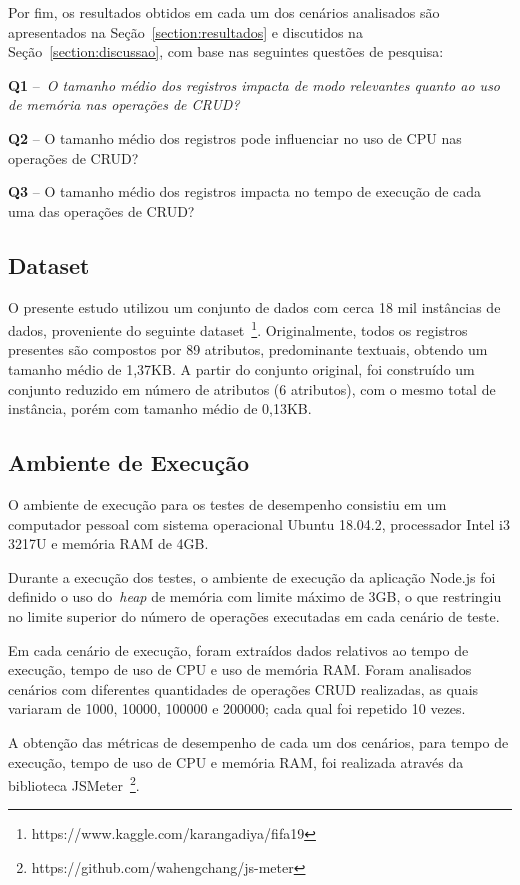 \documentclass[12pt]{article}
\begin{document}
Por fim, os resultados obtidos em cada um dos cenários analisados são apresentados na Seção~\ref{section:resultados} e discutidos na Seção~\ref{section:discussao}, com base nas seguintes questões de pesquisa:

\textbf{Q1} --~\emph{O tamanho médio dos registros impacta de modo relevantes quanto ao uso de memória nas operações de CRUD?}

\textbf{Q2} -- O tamanho médio dos registros pode influenciar no uso de CPU nas operações de CRUD? 

\textbf{Q3} -- O tamanho médio dos registros impacta no tempo de execução de cada uma das operações de CRUD?


\subsection{Dataset}

O presente estudo utilizou um conjunto de dados com cerca 18 mil instâncias de dados, proveniente do seguinte dataset~\footnote{https://www.kaggle.com/karangadiya/fifa19}.
Originalmente, todos os registros presentes são compostos por 89 atributos, predominante textuais, obtendo um tamanho médio de 1,37KB.
A partir do conjunto original, foi construído um conjunto reduzido em número de atributos (6 atributos), com o mesmo total de instância, porém com tamanho médio de 0,13KB.


\subsection{Ambiente de Execução}

O ambiente de execução para os testes de desempenho consistiu em um computador pessoal com sistema operacional Ubuntu 18.04.2, processador Intel i3 3217U e memória RAM de 4GB. 

Durante a execução dos testes, o ambiente de execução da aplicação Node.js foi definido o uso do~\emph{heap} de memória com limite máximo de 3GB, o que restringiu no limite superior do número de operações executadas em cada cenário de teste.

Em cada cenário de execução, foram extraídos dados relativos ao tempo de execução, tempo de uso de CPU e uso de memória RAM.
Foram analisados cenários com diferentes quantidades de operações CRUD realizadas, as quais variaram de 1000, 10000, 100000 e 200000; cada qual foi repetido 10 vezes. 

A obtenção das métricas de desempenho de cada um dos cenários, para tempo de execução, tempo de uso de CPU e memória RAM, foi realizada através da biblioteca JSMeter~\footnote{https://github.com/wahengchang/js-meter}. 
\end{document}
